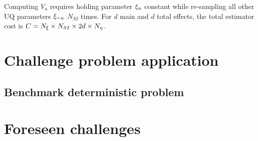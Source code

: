 Computing $V_u$ requires holding parameter ${\xi_u}$ constant while re-sampling all other UQ parameters ${\xi_{\sim u}}$ $N_{SI}$ times. %
For $d$ main and $d$ total effects, the total estimator cost is $C = {N_\xi} \times N_{SI} \times 2d \times {N_\eta}$. 




\section{Challenge problem application}
\subsection{Benchmark deterministic problem}

\section{Foreseen challenges}
